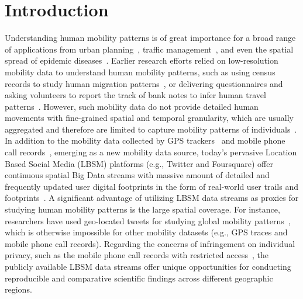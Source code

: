 \documentclass[ijgi,article,submit,moreauthors,pdftex,10pt,a4paper]{mdpi}
\theoremstyle{mdpi}
\newcounter{ex}
\newcounter{re}
\theoremstyle{mdpidefinition}
\begin{document}


\section{Introduction}
Understanding human mobility patterns is of great importance for a broad range of applications from urban planning~\cite{zheng2008understanding}, traffic management~\cite{jiang2009characterizing}, and even the spatial spread of epidemic diseases~\cite{belik2011natural}.
Earlier research efforts relied on low-resolution mobility data to understand human mobility patterns, such as using census records to study human migration patterns~\cite{greenwood1985human}, or delivering questionnaires and asking volunteers to report the track of bank notes to infer human travel patterns~\cite{brockmann2006scaling}.
However, such mobility data do not provide detailed human movements with fine-grained spatial and temporal granularity, which are usually aggregated and therefore are limited to capture mobility patterns of individuals~\cite{gonzalez2008understanding,Jurdak2015}.
In addition to the mobility data collected by GPS trackers~\cite{zheng2008understanding, rhee2011levy} and mobile phone call records~\cite{gonzalez2008understanding,sevtsuk2010does,kung2014exploring}, emerging as a new mobility data source, today's pervasive Location Based Social Media (LBSM) platforms (e.g., Twitter and Foursquare) offer continuous spatial Big Data streams with massive amount of detailed and frequently updated user digital footprints in the form of real-world user trails and footprints~\cite{thatcher2014living}.
A significant advantage of utilizing LBSM data streams as proxies for studying human mobility patterns is the large spatial coverage.
For instance, researchers have used geo-located tweets for studying global mobility patterns~\cite{hawelka2014geo}, which is otherwise impossible for other mobility datasets (e.g., GPS traces and mobile phone call records).
Regarding the concerns of infringement on individual privacy, such as the mobile phone call records with restricted access~\cite{giannotti2008mobility,crampton2014collect,Jurdak2015}, the publicly available LBSM data streams offer unique opportunities for conducting reproducible and comparative scientific findings across different geographic regions.
\end{document}
